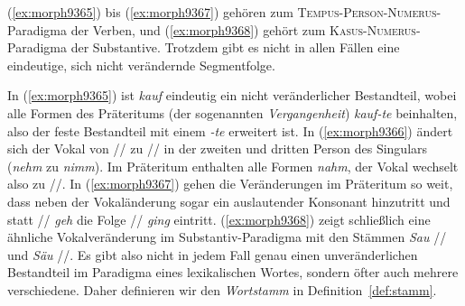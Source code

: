 \begin{exe}
  \ex \label{ex:morph9365}
  \begin{xlist}
  \end{xlist}
  \ex \label{ex:morph9366}
  \begin{xlist}
  \end{xlist}
  \ex \label{ex:morph9367}
  \begin{xlist}
  \end{xlist}
  \ex \label{ex:morph9368}
  \begin{xlist}
  \end{xlist}
\end{exe}


(\ref{ex:morph9365}) bis (\ref{ex:morph9367}) gehören zum \textsc{Tempus}-\textsc{Person}-\textsc{Numerus}-Paradigma der Verben, und (\ref{ex:morph9368}) gehört zum \textsc{Kasus}-\textsc{Numerus}-Paradigma der Substantive.
Trotzdem gibt es nicht in allen Fällen eine eindeutige, sich nicht verändernde Segmentfolge.

In (\ref{ex:morph9365}) ist \textit{kauf} eindeutig ein nicht veränderlicher Bestandteil, wobei alle Formen des Präteritums (der sogenannten \textit{Vergangenheit}) \textit{kauf-te} beinhalten, also der feste Bestandteil mit einem \textit{-te} erweitert ist.
In (\ref{ex:morph9366}) ändert sich der Vokal von // zu // in der zweiten und dritten Person des Singulars (\textit{nehm} zu \textit{nimm}).
Im Präteritum enthalten alle Formen \textit{nahm}, der Vokal wechselt also zu //.
In (\ref{ex:morph9367}) gehen die Veränderungen im Präteritum so weit, dass neben der Vokaländerung sogar ein auslautender Konsonant hinzutritt und statt // \textit{geh} die Folge // \textit{ging} eintritt.
(\ref{ex:morph9368}) zeigt schließlich eine ähnliche Vokalveränderung im Substantiv-Paradigma mit den Stämmen \textit{Sau} // und \textit{Säu} //.
Es gibt also nicht in jedem Fall genau einen unveränderlichen Bestandteil im Paradigma eines lexikalischen Wortes, sondern öfter auch mehrere verschiedene.
Daher definieren wir den \textit{Wortstamm} in Definition~\ref{def:stamm}.

